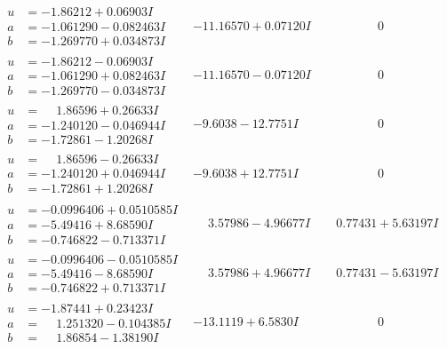 \documentclass[1p]{elsarticle_modified}
\theoremstyle{definition}
\begin{document}
$$\begin{array}{c|c|c}
\begin{aligned}
u &= -1.86212 + 0.06903 I \\
a &= -1.061290 - 0.082463 I \\
b &= -1.269770 + 0.034873 I\end{aligned}
 & -11.16570 + 0.07120 I & \phantom{-0.000000 } 0 \\ \hline\begin{aligned}
u &= -1.86212 - 0.06903 I \\
a &= -1.061290 + 0.082463 I \\
b &= -1.269770 - 0.034873 I\end{aligned}
 & -11.16570 - 0.07120 I & \phantom{-0.000000 } 0 \\ \hline\begin{aligned}
u &= \phantom{-}1.86596 + 0.26633 I \\
a &= -1.240120 - 0.046944 I \\
b &= -1.72861 - 1.20268 I\end{aligned}
 & -9.6038 - 12.7751 I & \phantom{-0.000000 } 0 \\ \hline\begin{aligned}
u &= \phantom{-}1.86596 - 0.26633 I \\
a &= -1.240120 + 0.046944 I \\
b &= -1.72861 + 1.20268 I\end{aligned}
 & -9.6038 + 12.7751 I & \phantom{-0.000000 } 0 \\ \hline\begin{aligned}
u &= -0.0996406 + 0.0510585 I \\
a &= -5.49416 + 8.68590 I \\
b &= -0.746822 - 0.713371 I\end{aligned}
 & \phantom{-}3.57986 - 4.96677 I & \phantom{-}0.77431 + 5.63197 I \\ \hline\begin{aligned}
u &= -0.0996406 - 0.0510585 I \\
a &= -5.49416 - 8.68590 I \\
b &= -0.746822 + 0.713371 I\end{aligned}
 & \phantom{-}3.57986 + 4.96677 I & \phantom{-}0.77431 - 5.63197 I \\ \hline\begin{aligned}
u &= -1.87441 + 0.23423 I \\
a &= \phantom{-}1.251320 - 0.104385 I \\
b &= \phantom{-}1.86854 - 1.38190 I\end{aligned}
 & -13.1119 + 6.5830 I & \phantom{-0.000000 } 0\\

\end{array}$$
\end{document}
